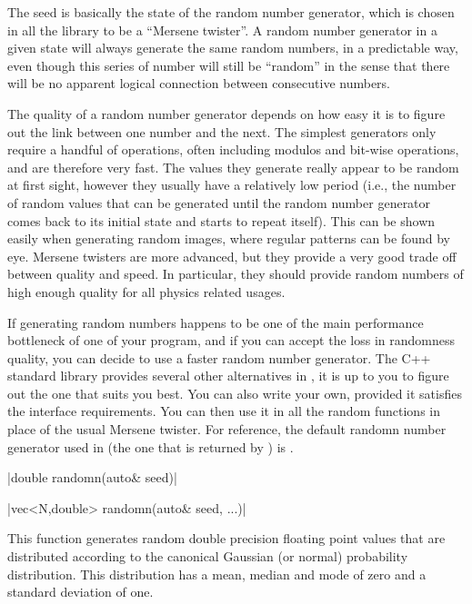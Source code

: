 \begin{advanced}
The seed is basically the state of the random number generator, which is chosen in all the \phypp library to be a ``Mersene twister''. A random number generator in a given state will always generate the same random numbers, in a predictable way, even though this series of number will still be ``random'' in the sense that there will be no apparent logical connection between consecutive numbers.

The quality of a random number generator depends on how easy it is to figure out the link between one number and the next. The simplest generators only require a handful of operations, often including modulos and bit-wise operations, and are therefore very fast. The values they generate really appear to be random at first sight, however they usually have a relatively low period (i.e., the number of random values that can be generated until the random number generator comes back to its initial state and starts to repeat itself). This can be shown easily when generating random images, where regular patterns can be found by eye. Mersene twisters are more advanced, but they provide a very good trade off between quality and speed. In particular, they should provide random numbers of high enough quality for all physics related usages.

If generating random numbers happens to be one of the main performance bottleneck of one of your program, and if you can accept the loss in randomness quality, you can decide to use a faster random number generator. The C++ standard library provides several other alternatives in , it is up to you to figure out the one that suits you best. You can also write your own, provided it satisfies the interface requirements. You can then use it in all the \phypp random functions in place of the usual Mersene twister. For reference, the default randomn number generator used in \phypp (the one that is returned by ) is .
\end{advanced}

\funcitem \cppinline|double randomn(auto& seed)| 

\cppinline|vec<N,double> randomn(auto& seed, ...)|

This function generates random double precision floating point values that are distributed according to the canonical Gaussian (or normal) probability distribution. This distribution has a mean, median and mode of zero and a standard deviation of one.

